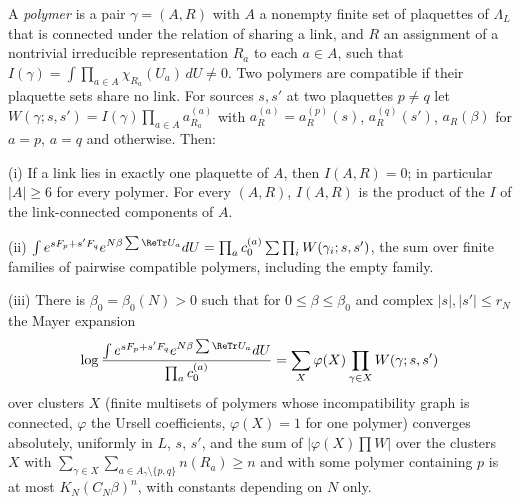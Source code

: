 \begin{lemma}\label{rEtwo:polymer}
A \emph{polymer} is a pair $\gamma=(A,R)$ with $A$ a nonempty finite set
of plaquettes of $\Lambda_L$ that is connected under the relation of
sharing a link, and $R$ an assignment of a nontrivial irreducible
representation $R_a$ to each $a\in A$, such that $I(\gamma)=\int\prod_{a
\in A}\chi_{R_a}(U_a)\,dU\ne0$. Two polymers are compatible if their
plaquette sets share no link. For sources $s,s'$ at two plaquettes $p\ne
q$ let $W(\gamma;s,s')=I(\gamma)\prod_{a\in A}a^{(a)}_{R_a}$ with
$a^{(a)}_R=a^{(p)}_R(s)$, $a^{(q)}_R(s')$, $a_R(\beta)$ for $a=p$, $a=q$
and otherwise. Then:

\textup{(i)} If a link lies in exactly one plaquette of $A$, then
$I(A,R)=0$; in particular $|A|\ge6$ for every polymer. For every $(A,R)$,
$I(A,R)$ is the product of the $I$ of the link-connected components of $A$.

\textup{(ii)} $\int e^{sF_p+s'F_q}e^{N\beta\sum\ReTr U_a}dU=\prod_ac^{(a)}_0
\sum\prod_iW(\gamma_i;s,s')$, the sum over finite families of pairwise
compatible polymers, including the empty family.

\textup{(iii)} There is $\beta_0=\beta_0(N)>0$ such that for $0\le\beta
\le\beta_0$ and complex $|s|,|s'|\le r_N$ the Mayer expansion
\[
\log\frac{\int e^{sF_p+s'F_q}e^{N\beta\sum\ReTr U_a}dU}{\prod_ac^{(a)}_0}=
\sum_X\varphi(X)\prod_{\gamma\in X}W(\gamma;s,s')
\]
over clusters $X$ (finite multisets of polymers whose incompatibility
graph is connected, $\varphi$ the Ursell coefficients, $\varphi(X)=1$ for
one polymer) converges absolutely, uniformly in $L$, $s$, $s'$, and the
sum of $|\varphi(X)\prod W|$ over the clusters $X$ with $\sum_{\gamma\in X}
\sum_{a\in A_\gamma\setminus\{p,q\}}n(R_a)\ge n$ and with some polymer
containing $p$ is at most $K_N(C_N\beta)^n$, with constants depending on
$N$ only.
\end{lemma}

